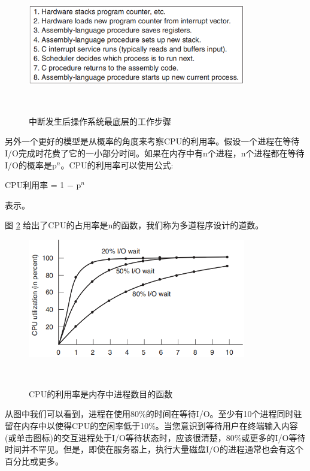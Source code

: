 	\begin{figure}[ht]\small
		\centering
		\includegraphics[width=0.85\textwidth]{FIG/2-5.png}
		\caption{中断发生后操作系统最底层的工作步骤}　\label{fig:interupt}
	\end{figure}
	
	另外一个更好的模型是从概率的角度来考察CPU的利用率。假设一个进程在等待I/O完成时花费了它的一小部分时间。如果在内存中有n个进程，n个进程都在等待I/O的概率是p$^{n}$。CPU的利用率可以使用公式: \begin{center} CPU利用率 = 1 − p$^{n}$ \end{center} 表示。
	
	图 \ref{fig:multiprogrammingdegree} 给出了CPU的占用率是n的函数，我们称为多道程序设计的道数。
	
	\begin{figure}[ht]\small
		\centering
		\includegraphics[width=0.85\textwidth]{FIG/2-6.png}
		\caption{CPU的利用率是内存中进程数目的函数}　\label{fig:multiprogrammingdegree}
	\end{figure}

	从图中我们可以看到，进程在使用80\%的时间在等待I/O。至少有10个进程同时驻留在内存中以使得CPU的空闲率低于10\%。当您意识到等待用户在终端输入内容(或单击图标)的交互进程处于I/O等待状态时，应该很清楚，80\%或更多的I/O等待时间并不罕见。但是，即使在服务器上，执行大量磁盘I/O的进程通常也会有这个百分比或更多。
		
